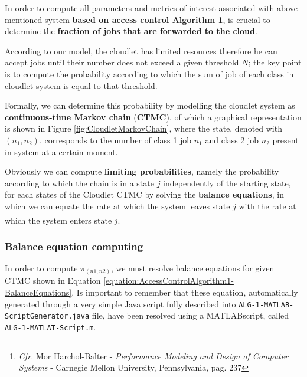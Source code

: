 \documentclass[10pt,a4paper]{article}
\begin{document}
In order to compute all parameters and metrics of interest associated with above-mentioned system \textbf{based on access control Algorithm 1}, is crucial to determine the \textbf{fraction of jobs that are forwarded to the cloud}. 

According to our model, the cloudlet has limited resources therefore he can accept jobs until their number does not exceed a given threshold $N$; the key point is to compute the probability according to which the sum of job of each class in cloudlet system is equal to that threshold. 

Formally, we can determine this probability by modelling the cloudlet system as \textbf{continuous-time Markov chain} (\textbf{CTMC}), of which a graphical representation is shown in Figure \ref{fig:CloudletMarkovChain}, where the state, denoted with $(n_1,n_2)$, corresponds to the number of class 1 job $n_1$ and class 2 job $n_2$ present in system at a certain moment.

Obviously we can compute \textbf{limiting probabilities}, namely the probability according to which the chain is in a state $j$ independently of the starting state, for each states of the Cloudlet CTMC by solving the \textbf{balance equations}, in which we can equate the rate at which the system leaves state $j$ with the rate at which the system enters state $j$.\footnote{\textit{Cfr.} Mor Harchol-Balter - \textit{Performance Modeling and Design of Computer Systems} - Carnegie Mellon University, Pennsylvania, pag. 237}

\subsubsection{Balance equation computing} In order to compute $\pi_{(n1,n2)}$, we must resolve balance equations for given CTMC shown in Equation \ref{equation:AccessControlAlgorithm1-BalanceEquations}. Is important to remember that these equation, automatically generated through a very simple Java script fully described into \texttt{ALG-1-MATLAB-ScriptGenerator.java} file, have been resolved using a MATLAB\texttrademark  script, called \texttt{ALG-1-MATLAT-Script.m}.
\end{document}
